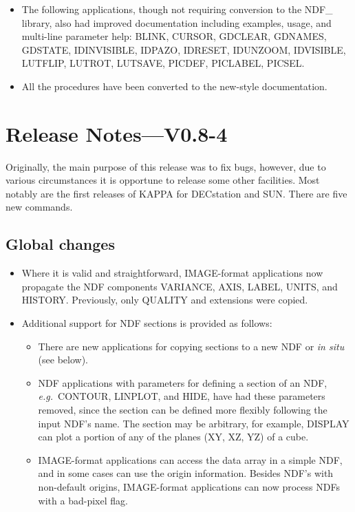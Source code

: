 {\begin{itemize}
  \item The following applications, though not requiring conversion to the
    NDF\_ library, also had improved documentation including examples,
    usage, and multi-line parameter help:  BLINK, CURSOR, GDCLEAR,
    GDNAMES, GDSTATE, IDINVISIBLE, IDPAZO, IDRESET, IDUNZOOM,
    IDVISIBLE, LUTFLIP, LUTROT, LUTSAVE, PICDEF, PICLABEL, PICSEL.
    
  \item All the procedures have been converted to the new-style
    documentation.
\end{itemize}

\newpage
\section{Release Notes---V0.8-4}
Originally, the main purpose of this release was to fix bugs, however, 
due to various circumstances it is opportune to release some other
facilities.  Most notably are the first releases of KAPPA for
DECstation and SUN.  There are five new commands.

\subsection{Global changes}
\begin{itemize}
  \item  Where it is valid and straightforward, IMAGE-format applications
    now propagate the NDF components VARIANCE, AXIS, LABEL, UNITS,
    and HISTORY.  Previously, only QUALITY and extensions were copied.

  \item  Additional support for NDF sections is provided as follows:

     \begin{itemize}

     \item  There are new applications for copying sections to a new
       NDF or {\it in situ\/} (see below).

     \item  NDF applications with parameters for defining a section
       of an NDF, {\it e.g.}\ CONTOUR, LINPLOT, and HIDE, have had
       these parameters removed, since the section can be defined more
       flexibly following the input NDF's name.  The section may be
       arbitrary, for example, DISPLAY can plot a portion of any of
       the planes (XY, XZ, YZ) of a cube.

     \item  IMAGE-format applications can access the data array in a
       simple NDF, and in some cases can use the origin information.
       Besides NDF's with non-default origins, IMAGE-format applications
       can now process NDFs with a bad-pixel flag.


\end{itemize}
\end{itemize}}
